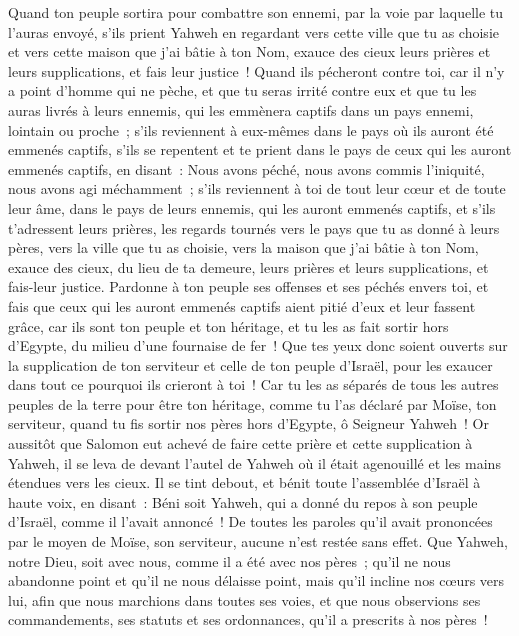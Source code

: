 \begin{multicols}{2}
Quand ton peuple sortira pour combattre son ennemi, par la voie par laquelle tu l'auras envoyé, s'ils prient Yahweh en regardant vers cette ville que tu as choisie et vers cette maison que j'ai bâtie à ton Nom, 
exauce des cieux leurs prières et leurs supplications, et fais leur justice~!
Quand ils pécheront contre toi, car il n'y a point d'homme qui ne pèche, et que tu seras irrité contre eux et que tu les auras livrés à leurs ennemis, qui les emmènera captifs dans un pays ennemi, lointain ou proche~;
s'ils reviennent à eux-mêmes dans le pays où ils auront été emmenés captifs, s'ils se repentent et te prient dans le pays de ceux qui les auront emmenés captifs, en disant~: Nous avons péché, nous avons commis l'iniquité, nous avons agi méchamment~;
s'ils reviennent à toi de tout leur cœur et de toute leur âme, dans le pays de leurs ennemis, qui les auront emmenés captifs, et s'ils t'adressent leurs prières, les regards tournés vers le pays que tu as donné à leurs pères, vers la ville que tu as choisie, vers la maison que j'ai bâtie à ton Nom,
exauce des cieux, du lieu de ta demeure, leurs prières et leurs supplications, et fais-leur justice.
Pardonne à ton peuple ses offenses et ses péchés envers toi, et fais que ceux qui les auront emmenés captifs aient pitié d'eux et leur fassent grâce,
car ils sont ton peuple et ton héritage, et tu les as fait sortir hors d'Egypte, du milieu d'une fournaise de fer~!
Que tes yeux donc soient ouverts sur la supplication de ton serviteur et celle de ton peuple d'Israël, pour les exaucer dans tout ce pourquoi ils crieront à toi~!
Car tu les as séparés de tous les autres peuples de la terre pour être ton héritage, comme tu l'as déclaré par Moïse, ton serviteur, quand tu fis sortir nos pères hors d'Egypte, ô Seigneur Yahweh~!
Or aussitôt que Salomon eut achevé de faire cette prière et cette supplication à Yahweh, il se leva de devant l'autel de Yahweh où il était agenouillé et les mains étendues vers les cieux.
Il se tint debout, et bénit toute l'assemblée d'Israël à haute voix, en disant~:
Béni soit Yahweh, qui a donné du repos à son peuple d'Israël, comme il l'avait annoncé~! De toutes les paroles qu'il avait prononcées par le moyen de Moïse, son serviteur, aucune n'est restée sans effet.
Que Yahweh, notre Dieu, soit avec nous, comme il a été avec nos pères~; qu'il ne nous abandonne point et qu'il ne nous délaisse point,
mais qu'il incline nos cœurs vers lui, afin que nous marchions dans toutes ses voies, et que nous observions ses commandements, ses statuts et ses ordonnances, qu'il a prescrits à nos pères~!

\end{multicols}
